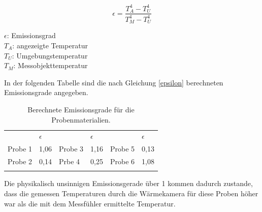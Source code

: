 \begin{equation}\label{epsilon}
\epsilon=\frac{T_A^4-T_U^4}{T_M^4-T_U^4}
\end{equation}

\begin{center}
	\begin{small}
		$\epsilon$: Emissionsgrad\\
		$T_A$: angezeigte Temperatur\\
		$T_U$: Umgebungstemperatur\\
		$T_M$: Messobjekttemperatur\\
	\end{small}
\end{center}

In der folgenden Tabelle sind die nach Gleichung \ref{epsilon} berechneten Emissionsgrade angegeben. 

\begin{table}[H]
	\centering
	\caption{Berechnete Emissionsgrade für die Probenmaterialien.}
	\label{tab:emissionsgrade}
	\begin{tabular}{llllll}
		&    $\epsilon$  &        &  $\epsilon$    &         &  $\epsilon$    \\
		Probe 1 & 1,06 & Probe 3 & 1,16 & Probe 5 & 0,13 \\
		Probe 2 & 0,14 & Prbe 4  & 0,25 & Probe 6 & 1,08 \\
		&      &         &      &         &     
	\end{tabular}
\end{table}

Die physikalisch unsinnigen Emissionsgerade über 1 kommen dadurch zustande, dass die gemessen Temperaturen durch die Wärmekamera für diese Proben höher war als die mit dem Messfühler ermittelte Temperatur. 